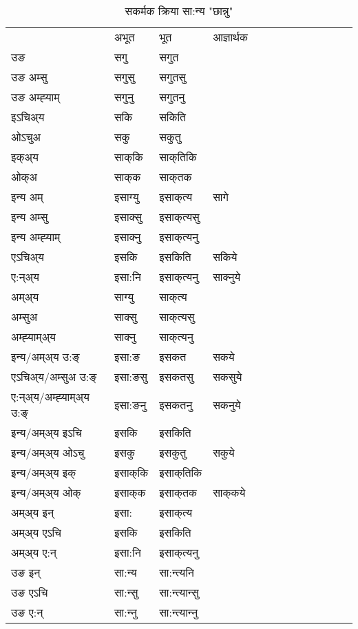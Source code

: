 \begin{table}[H]
\centering
\caption{\label{ak.vt} सकर्मक क्रिया  सा:न्य  "छान्नु"  }
\begin{tabular}{l|l|l|l|l|l|l|l|l|l|l|l|l}  \toprule
&अभूत & भूत & आज्ञार्थक \\ 
उङ &सगु &सगुत \\ 
उङ अम्सु &सगुसु &सगुतसु \\ 
उङ अम्ह्‍याम् &सगुनु &सगुतनु \\ 
इऽचिअ्य &सकि &सकिति   \\ 
ओऽचुअ &सकु &सकुतु   \\ 
इक्अ्य &साक्‌कि &साक्‌तिकि   \\ 
ओक्अ &साक्‌क &साक्‌तक   \\ 
इन्य अम् & इसाग्यु  & इसाक्‌त्य &सागे  \\ 
इन्य अम्सु & इसाक्सु  & इसाक्‌त्यसु   \\ 
इन्य अम्ह्‍याम् & इसाक्‍नु  & इसाक्‌त्यनु   \\ 
एऽचिअ्य & इसकि & इसकिति &सकिये    \\ 
ए:न्अ्य & इसा:नि  & इसाक्‌त्यनु &साक्‍नुये  \\ 
अम्अ्य & साग्यु  & साक्‌त्य  \\ 
अम्सुअ & साक्सु & साक्‌त्यसु  \\ 
अम्ह्‍याम्अ्य & साक्‍नु  & साक्‌त्यनु \\ 
\midrule
इन्य/अम्अ्य उ:ङ्‌&इसा:ङ & इसकत &सकये \\ 
एऽचिअ्य/अम्सुअ उ:ङ्‌ &इसा:ङसु & इसकतसु &सकसुये \\ 
ए:न्अ्य/अम्ह्‍याम्अ्य उ:ङ्‌ &इसा:ङनु & इसकतनु &सकनुये \\ 
इन्य/अम्अ्य इऽचि & इसकि & इसकिति    \\ 
इन्य/अम्अ्य ओऽचु & इसकु & इसकुतु  &सकुये  \\ 
इन्य/अम्अ्य इक् & इसाक्‌कि & इसाक्‌तिकि   \\ 
इन्य/अम्अ्य ओक् & इसाक्‌क & इसाक्‌तक  &साक्‌कये  \\ 
अम्अ्य इन् & इसा: & इसाक्‌त्य   \\ 
अम्अ्य एऽचि & इसकि & इसकिति    \\ 
अम्अ्य ए:न् & इसा:नि  & इसाक्‌त्यनु  \\ 
\midrule
उङ इन् & सा:न्य  & सा:न्त्यनि  \\ 
उङ एऽचि & सा:न्सु  & सा:न्त्यान्सु   \\ 
उङ ए:न्& सा:न्‍नु  & सा:न्त्यान्‍नु   \\ 
\bottomrule
\end{tabular}
\end{table}


